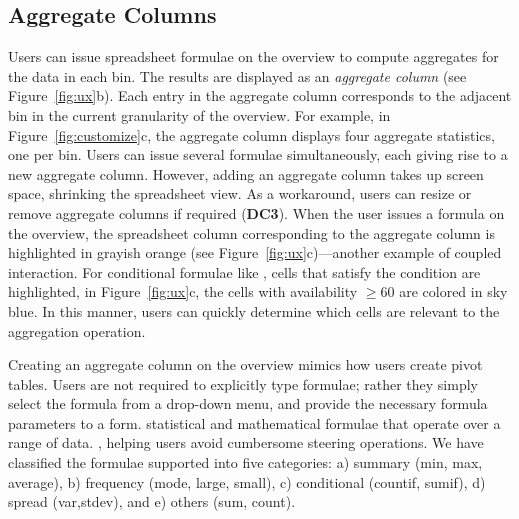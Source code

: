 \subsection{Aggregate Columns}
Users can issue spreadsheet formulae
on the overview
to compute aggregates for the data
in each bin.
The results
are displayed as an {\em aggregate column} (see Figure~\ref{fig:ux}b). Each entry in the aggregate column
corresponds to the adjacent bin
in the current granularity
of the overview.
For example, in Figure~\ref{fig:customize}c,
the aggregate column displays
four aggregate statistics,
one per bin.
Users can issue several formulae simultaneously,
each giving rise to a new aggregate column.
However, adding an aggregate column
takes up screen space, shrinking the spreadsheet view.
As a workaround, users can resize or
remove aggregate columns if required (\textbf{DC3}).
When the user issues a formula on the overview,
the spreadsheet column
corresponding to the aggregate column
is highlighted in grayish orange
(see Figure~\ref{fig:ux}c)---another example of coupled interaction.
For conditional formulae like ,
cells that satisfy the condition
are highlighted, \eg in Figure~\ref{fig:ux}c,
the cells with availability $\ge 60$ are colored in sky blue.
In this manner,
users can quickly determine which cells
are relevant to the aggregation operation.

Creating an aggregate column on the overview mimics how users create pivot tables. Users
are not required to explicitly type formulae;
rather they simply select the formula from a drop-down menu,
and provide the necessary formula parameters to a form.
 statistical
and mathematical formulae that
operate over a range of data.
,
helping users avoid cumbersome steering operations.
We have classified the formulae supported
into five categories: a) summary (\eg min, max, average),
b) frequency (\eg mode, large, small), c) conditional (\eg countif, sumif), d) spread (\eg var,stdev), and e) others (\eg sum, count).

